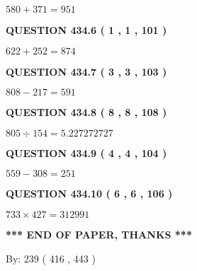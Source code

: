 \documentclass{ctexart}
\begin{document}
 

$ %
580 +  %
371=   %
951$
 
 
  
\vspace{0.2in}
  
{\textbf{\Large{QUESTION
434.6 
 ( 1 , 1 , 101 )
}}}
  
  
 
 

$ %
622 +  %
252=   %
874$
 
 
  
\vspace{0.2in}
  
{\textbf{\Large{QUESTION
434.7 
 ( 3 , 3 , 103 )
}}}
  
  
 
 

$ %
808 -  %
217=   %
591$
 
 
  
\vspace{0.2in}
  
{\textbf{\Large{QUESTION
434.8 
 ( 8 , 8 , 108 )
}}}
  
  
 
 

$ %
805 \div  %
154=   %
5.227272727$
 
 
  
\vspace{0.2in}
  
{\textbf{\Large{QUESTION
434.9 
 ( 4 , 4 , 104 )
}}}
  
  
 
 

$ %
559 -  %
308=   %
251$
 
 
  
\vspace{0.2in}
  
{\textbf{\Large{QUESTION
434.10 
 ( 6 , 6 , 106 )
}}}
  
  
 
 

$ %
733 \times  %
427=   %
312991$
 
 
   
   
 \vspace{0.2in}
 
   
   
   
   
\vspace{1.0in} 
{\textbf{\large{ *** END OF PAPER, THANKS *** }}} 
   
   
\hspace{1.0in} By: 
 239 ( 416 ,  443 )
   
\end{document}
